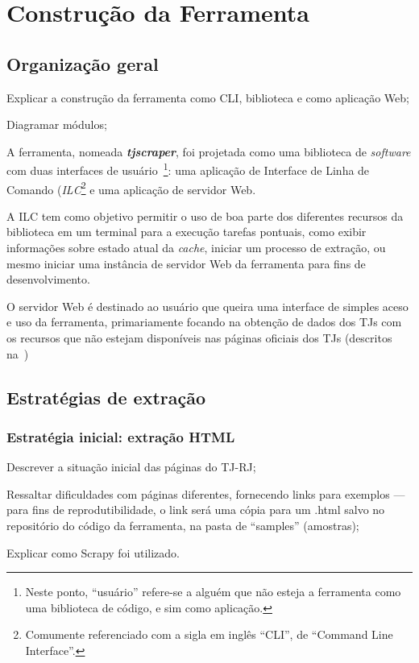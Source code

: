 \chapter{Construção da Ferramenta~\label{chp:construção-da-ferramenta}}

\section{Organização geral}

\begin{todolist}
    \item Explicar a construção da ferramenta como CLI, biblioteca e como
          aplicação Web;
    \item Diagramar módulos;
\end{todolist}

A ferramenta, nomeada \textit{\textbf{tjscraper}}, foi projetada como uma
biblioteca de \textit{software} com duas interfaces de usuário~\footnote{Neste
ponto, ``usuário'' refere-se a alguém que não esteja a ferramenta como uma
biblioteca de código, e sim como aplicação.}: uma aplicação de Interface de
Linha de Comando (\textit{ILC}\footnote{Comumente referenciado com a sigla em
inglês ``CLI'', de ``Command Line Interface''.} e uma aplicação de servidor
Web.

A ILC tem como objetivo permitir o uso de boa parte dos diferentes recursos da
biblioteca em um terminal para a execução tarefas pontuais, como exibir
informações sobre estado atual da \textit{cache}, iniciar um processo de
extração, ou mesmo iniciar uma instância de servidor Web da ferramenta para
fins de desenvolvimento.

O servidor Web é destinado ao usuário que queira uma interface de simples aceso
e uso da ferramenta, primariamente focando na obtenção de dados dos TJs com os
recursos que não estejam disponíveis nas páginas oficiais dos TJs (descritos
na~)

\section{Estratégias de extração}

\subsection{Estratégia inicial: extração HTML}

\begin{todolist}
    \item Descrever a situação inicial das páginas do TJ-RJ;
    \item Ressaltar dificuldades com páginas diferentes, fornecendo links para
          exemplos --- para fins de reprodutibilidade, o link será uma cópia
          para um .html salvo no repositório do código da ferramenta, na pasta
          de ``samples'' (amostras);
    \item Explicar como Scrapy foi utilizado.
\end{todolist}

